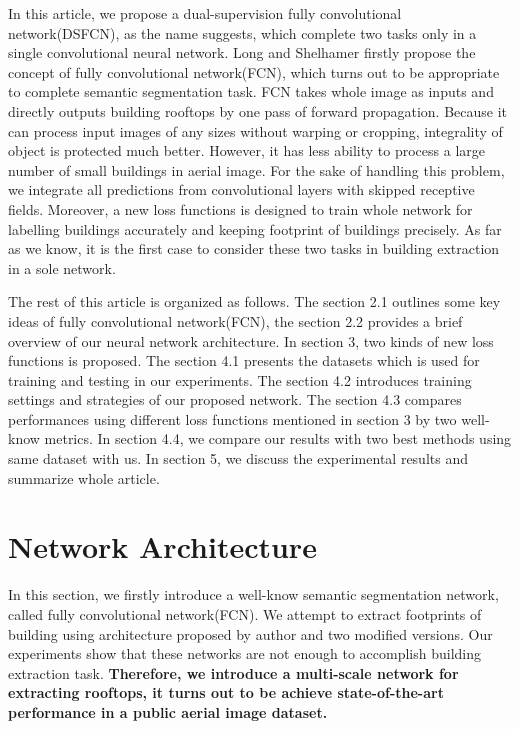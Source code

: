 \documentclass[runningheads]{llncs}
\begin{document}
  In this article, we propose a dual-supervision fully convolutional network(DSFCN), as the name suggests, which complete two tasks only in a single convolutional neural network. Long and Shelhamer \cite{Long2014Fully} firstly propose the concept of fully convolutional network(FCN), which turns out to be  appropriate to complete semantic segmentation task. FCN takes whole image as inputs and directly outputs building rooftops by one pass of forward propagation. Because it can process input images of any sizes without warping or cropping, integrality of object is protected much better. However, it has less ability to  process a large number of small buildings in aerial image.  For the sake of handling this problem, we integrate all predictions from convolutional layers with skipped receptive fields. Moreover, a new loss functions is designed to train whole network for  labelling buildings accurately and keeping footprint of  buildings precisely. As far as we know, it is the first case to consider these two tasks in building extraction in a sole network.
  
  The rest of this article is organized as follows. The section 2.1 outlines some key ideas of fully convolutional network(FCN), the section 2.2 provides a brief overview of our neural network architecture. In section 3, two kinds of new loss functions is proposed. The section 4.1  presents the datasets which is used for training and testing in our experiments. The section 4.2  introduces training settings and strategies of our proposed network.  The section 4.3  compares  performances using different loss functions mentioned in section 3 by two well-know metrics. In section 4.4, we compare our results with two best methods using same dataset with us. In section 5, we discuss the experimental results and summarize whole article.
	
\section{Network Architecture}
     In this section, we firstly introduce a well-know semantic segmentation network, called fully convolutional network(FCN)\cite{Long2014Fully}. We attempt to extract footprints of building  using  architecture proposed by author and two modified versions. Our experiments show that these networks are not enough to accomplish building   extraction task. \textbf{Therefore, we introduce a multi-scale network for extracting rooftops, it turns out to be achieve state-of-the-art performance in a public aerial image dataset. }
     
\end{document}
